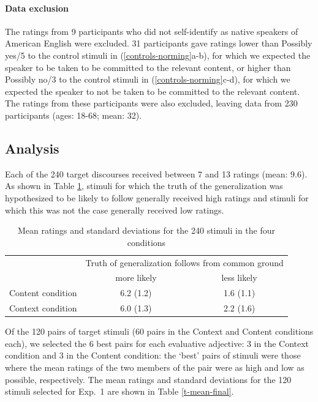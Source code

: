 \documentclass[11pt,fleqn]{article}
\newcommand{\6}{\mbox{$[\hspace*{-.6mm}[$}}
\newcommand{\9}{\mbox{$]\hspace*{-.6mm}]$}}
\begin{document}
\paragraph{Data exclusion} 

The ratings from 9 participants who did not self-identify as native speakers of American English were excluded. 31 participants gave ratings lower than Possibly yes/5 to the control stimuli in (\ref{controls-norming}a-b), for which we expected the speaker to be taken to be committed to the relevant content, or higher than Possibly no/3 to the control stimuli in (\ref{controls-norming}c-d), for which we expected the speaker to not be taken to be committed to the relevant content. The ratings from these participants were also excluded, leaving data from 230 participants (ages: 18-68; mean: 32). 

\subsection{Analysis}

Each of the 240 target discourses received between 7 and 13 ratings (mean: 9.6). As shown in Table \ref{t-mean-norming1}, stimuli for which the truth of the generalization was hypothesized to be likely to follow generally received high ratings and stimuli for which this was not the case generally received low ratings.

\begin{table}[!h]
\centering

\begin{tabular}{l|cc}
& \multicolumn{2}{c}{Truth of generalization follows from common ground} \\
& more likely & less likely \\\hline

Content condition &  6.2 (1.2) &  1.6 (1.1) \\
Context condition &  6.0 (1.3) &  2.2 (1.6) \\

\hline
\end{tabular}

\caption{Mean ratings and standard deviations for the 240 stimuli in the four conditions}\label{t-mean-norming1}

\end{table}

Of the 120 pairs of target stimuli (60 pairs in the Context and Content conditions each), we selected the 6 best pairs for each evaluative adjective: 3 in the Context condition and 3 in the Content condition: the `best' pairs of stimuli were those where the mean ratings of the two members of the pair were as high and low as possible, respectively. The mean ratings and standard deviations for the 120 stimuli selected for Exp.~1 are shown in Table \ref{t-mean-final}.
\end{document}
